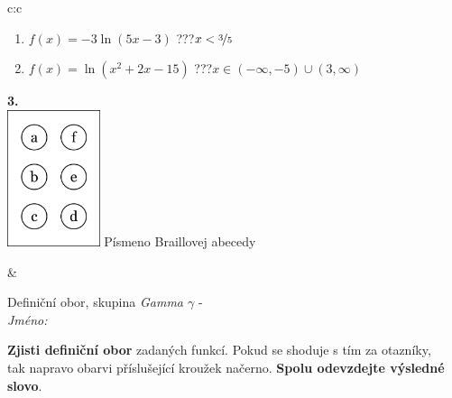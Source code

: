 \documentclass[10pt]{report}
\begin{document}
\begin{tabular}{c:c}
\begin{minipage}[c][104.5mm][t]{0.5\linewidth}
\begin{center}
\begin{minipage}{0.79\linewidth}
\begin{center}
\begin{varwidth}{\linewidth}
\begin{enumerate}
\item $f(x)=-3\ln{(5x-3)}$\quad \dotfill\; ???\;\dotfill \quad $x<\nicefrac{3}{5}$
\item $f(x)=\ln{(x^2+2x-15)}$\quad \dotfill\; ???\;\dotfill \quad $x\in(-\infty , -5)\cup(3 , \infty)$
\end{enumerate}
\end{varwidth}
\end{center}
\end{minipage}
\begin{minipage}{0.20\linewidth}
\begin{center}
{\Huge\bfseries 3.} \\[2mm]
\includegraphics[height=40mm]{../images/braille.png}
{\small Písmeno Braillovej abecedy}
\end{center}
\end{minipage}
\end{center}
\end{minipage}
&
\begin{minipage}[c][104.5mm][t]{0.5\linewidth}
\begin{center}
\vspace{7mm}
{\huge Definiční obor, skupina \textit{Gamma $\gamma$} -}\\[5mm]
\textit{Jméno:}\phantom{xxxxxxxxxxxxxxxxxxxxxxxxxxxxxxxxxxxxxxxxxxxxxxxxxxxxxxxxxxxxxxxxx}\\[5mm]
\begin{minipage}{0.95\linewidth}
\begin{center}
\textbf{Zjisti definiční obor} zadaných funkcí. Pokud se shoduje s tím za otazníky,\\tak napravo obarvi příslušející kroužek načerno. \textbf{Spolu odevzdejte výsledné slovo}.
\end{center}
\end{minipage}
\\[1mm]
\begin{minipage}{0.79\linewidth}
\begin{center}
\begin{varwidth}{\linewidth}
\begin{enumerate}

\end{enumerate}
\end{varwidth}
\end{center}
\end{minipage}
\end{center}
\end{minipage}
\end{tabular}
\end{document}
